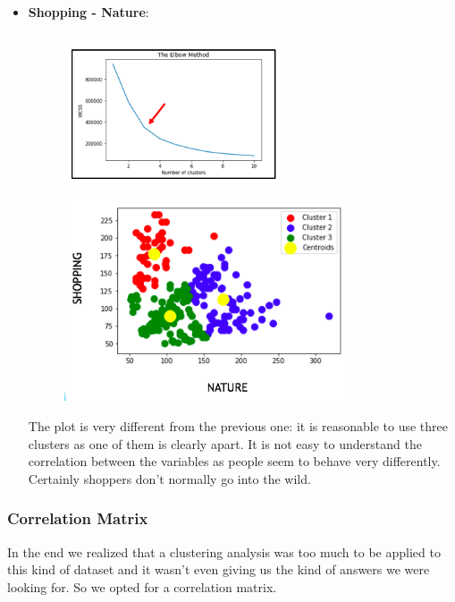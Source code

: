 \begin{itemize}
\newpage

\item \textbf{Shopping - Nature}:

\begin{figure}[H]
\centering
\includegraphics[width=0.6\textwidth]{Img/3_elbow.png}
\end{figure}
\begin{figure}[H]
\centering
\includegraphics[width=0.8\textwidth]{Img/3_cluster.png}
\end{figure}

The plot is very different from the previous one: it is reasonable to use three clusters as one of them is clearly apart. It is not easy to understand the correlation between the variables as people seem to behave very differently. Certainly shoppers don't normally go into the wild.

\end{itemize}

\newpage
\subsubsection{Correlation Matrix}
In the end we realized that a clustering analysis was too much to be applied to this kind of dataset and it wasn't even giving us the kind of answers we were looking for. So we opted for a correlation matrix.

